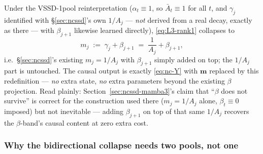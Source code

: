 \documentclass[11pt,a4paper]{article}
\begin{document}
Under the VSSD-1pool reinterpretation ($\alpha_t\equiv1$, so
$\bar A_t\equiv1$ for all $t$, and $\gamma_j$ identified with
\S\ref{sec:ncssd}'s own $1/A_j$ --- \emph{not} derived from a real
decay, exactly as there --- with $\beta_{j+1}$ likewise learned
directly), \eqref{eq:L3-rank1} collapses to
\begin{equation}\label{eq:m-beta-gamma}
  m_j \;:=\; \gamma_j + \beta_{j+1} \;=\; \frac{1}{A_j} + \beta_{j+1},
\end{equation}
i.e.\ \S\ref{sec:ncssd}'s existing $m_j=1/A_j$ with $\beta_{j+1}$
simply added on top; the $1/A_j$ part is untouched. The causal output
is exactly \eqref{eq:nc-Y} with $\bm{m}$ replaced by this redefinition
--- \emph{no} extra state, \emph{no} extra parameters beyond the
existing $\beta$ projection. Read plainly: Section~\ref{sec:ncssd-mamba3}'s
claim that ``$\beta$ does not survive'' is correct for the
construction used there ($m_j=1/A_j$ alone, $\beta_t\equiv0$ imposed)
but not inevitable --- adding $\beta_{j+1}$ on top of that same
$1/A_j$ recovers the $\beta$-band's causal content at zero extra cost.

\subsubsection{Why the bidirectional collapse needs two pools, not one}
\label{sec:two-pools}
\end{document}
